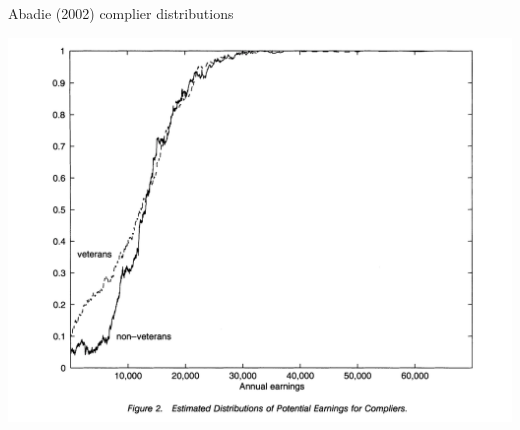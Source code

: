 \documentclass[notes,11pt, aspectratio=169]{beamer}
\begin{document}
\begin{frame}{Abadie (2002) complier distributions}
  \begin{center}
    \includegraphics[width=0.7\linewidth]{images/abadie_kappa2.png}
  \end{center}
\end{frame}
\end{document}

